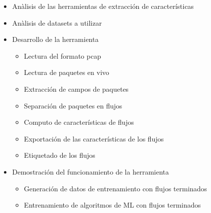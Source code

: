 \begin{itemize}
  \item Anàlisis de las herramientas de extracción de características
  \item Anàlisis de datasets a utilizar
  \item Desarrollo de la herramienta
  \begin{itemize}
    \item Lectura del formato pcap
    \item Lectura de paquetes en vivo
    \item Extracción de campos de paquetes
    \item Separación de paquetes en flujos
    \item Computo de características de flujos
    \item Exportación de las características de los flujos
    \item Etiquetado de los flujos
  \end{itemize}
  \item Demostración del funcionamiento de la herramienta
  \begin{itemize}
    \item Generación de datos de entrenamiento con flujos terminados
    \item Entrenamiento de algoritmos de ML con flujos terminados
  \end{itemize}
\end{itemize}

